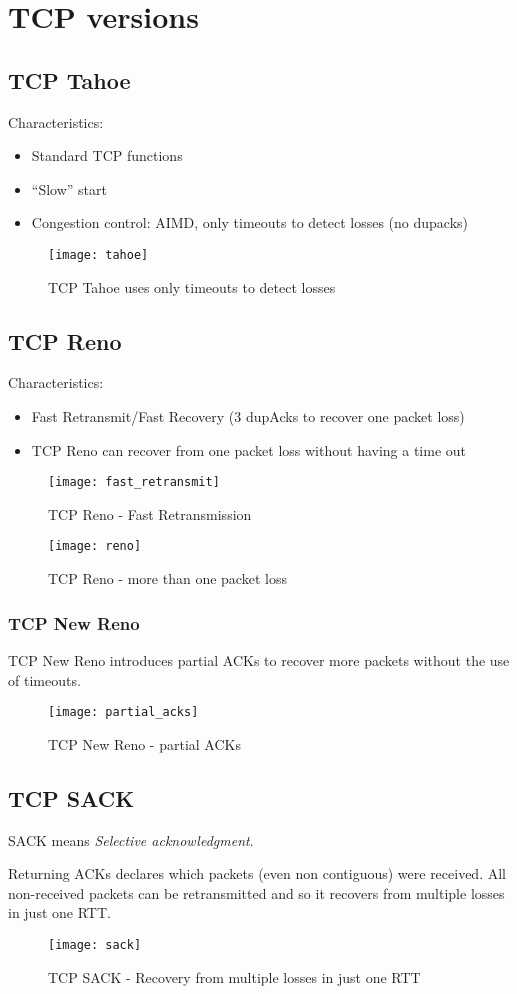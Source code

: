 \newpage
\section{TCP versions}

\subsection{TCP Tahoe}
Characteristics:
\begin{itemize}
  \item Standard TCP functions
  \item ``Slow'' start
  \item Congestion control: AIMD, only timeouts to detect losses (no dupacks)
\end{itemize}

\begin{figure}[h]
  \texttt{[image: tahoe]}
  \caption[TCP Tahoe]{TCP Tahoe uses only timeouts to detect losses}
\end{figure}

\subsection{TCP Reno}
Characteristics:
\begin{itemize}
  \item Fast Retransmit/Fast Recovery (3 dupAcks to recover one packet loss)
  \item TCP Reno can recover from one packet loss without having a time out
\end{itemize}

\begin{figure}[h]
  \texttt{[image: fast\_retransmit]}
  \caption[TCP Reno 1]{TCP Reno - Fast Retransmission}
\end{figure}

\begin{figure}[h]
  \texttt{[image: reno]}
  \caption[TCP Reno 2]{TCP Reno - more than one packet loss}
\end{figure}

\subsubsection{TCP New Reno}
TCP New Reno introduces partial ACKs to recover more packets without the use of
timeouts.
\begin{figure}[h]
  \texttt{[image: partial\_acks]}
  \caption[TCP New Reno]{TCP New Reno - partial ACKs}
\end{figure}

\subsection{TCP SACK}
SACK means \textit{Selective acknowledgment}.

Returning ACKs declares which packets (even non contiguous) were received.
All non-received packets can be retransmitted and so it recovers from multiple
losses in just one RTT.
\begin{figure}[h]
  \texttt{[image: sack]}
  \caption[TCP SACK]{TCP SACK - Recovery from multiple losses in just one RTT}
\end{figure}
